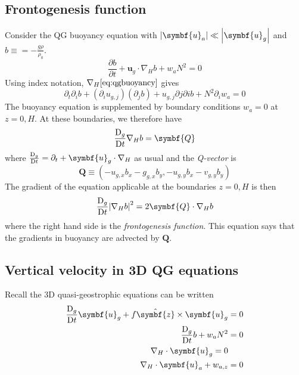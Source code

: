 \documentclass{jknotes}
\begin{document}
\subsection{Frontogenesis function}
Consider the QG buoyancy equation with $\abs{\symbf{u}_a} \ll
\abs{\symbf{u}_g}$ and $b \equiv = -\frac{g\rho}{\rho_0}$.
\begin{equation}
	\frac{\partial b}{\partial t} + \symbf{u}_g \cdot \nabla_H b + w_a N^2 = 0
	\label{eq:qgbuoyancy}
\end{equation}
Using index notation, $\nabla_H \eqref{eq:qgbuoyancy}$ gives
\begin{equation}
	\partial_t \partial_i b + (\partial_i u_{g,j})(\partial_j b) +
	u_{g,j}\partial j \partial i b + N^2 \partial_i w_a = 0
\end{equation}
The buoyancy equation is supplemented by boundary conditions $w_a = 0$ at
$z=0, H$. At these boundaries, we therefore have
\begin{equation}
	\frac{\diffD_g}{\diffD t} \nabla_H b = \symbf{Q}
\end{equation}
where $\frac{\diffD_g}{\diffD t} = \partial_t + \symbf{u}_g \cdot \nabla_H$ as
usual and the \emph{Q-vector} is
\begin{equation}
	\symbf{Q} \equiv (-u_{g,x} b_x - g_{g,x} b_y, -u_{g,y} b_x - v_{g,y}b_y)
\end{equation}
The gradient of the equation applicable at the boundaries $z=0,H$ is then
\begin{equation}
	\frac{\diffD_g}{\diffD t} \abs{\nabla_H b}^2 = 2\symbf{Q}\cdot\nabla_H b
	\label{eq:frontogenesis}
\end{equation}
where the right hand side is the \emph{frontogenesis function}. This equation
says that the gradients in buoyancy are advected by $\symbf{Q}$.

\subsection{Vertical velocity in 3D QG equations}
Recall the 3D quasi-geostrophic equations can be written
\begin{align}
	\frac{\diffD_g}{\diffD t} \symbf{u}_g + f \hat{\symbf{z}}\times
	\symbf{u}_g &= 0 \label{eq:3dqg.1} \\
	\frac{\diffD_g}{\diffD t} b + w_a N^2 &= 0 \label{eq:3dqg.2} \\
	\nabla_H \cdot \symbf{u}_g = 0 \label{eq:3dqg.3} \\
	\nabla_H \cdot \symbf{u}_a + w_{a,z} &= 0 \label{eq:3dqg.4}
\end{align}
\end{document}
